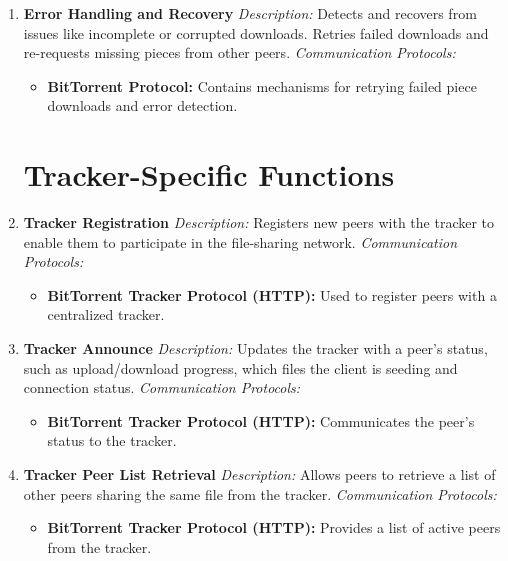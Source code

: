\documentclass[a4paper]{article}
\begin{document}
\begin{enumerate}[label=\textbf{\arabic*.}, leftmargin=*, itemsep=10pt]
    \item \textbf{Error Handling and Recovery}  
    \textit{Description:} Detects and recovers from issues like incomplete or corrupted downloads. Retries failed downloads and re-requests missing pieces from other peers.  
    \textit{Communication Protocols:}
    \begin{itemize}
        \item \textbf{BitTorrent Protocol:} Contains mechanisms for retrying failed piece downloads and error detection.
    \end{itemize}
    \section{Tracker-Specific Functions}
    \item \textbf{Tracker Registration}  
    \textit{Description:} Registers new peers with the tracker to enable them to participate in the file-sharing network.  
    \textit{Communication Protocols:}
    \begin{itemize}
        \item \textbf{BitTorrent Tracker Protocol (HTTP):} Used to register peers with a centralized tracker.
    \end{itemize}

    \item \textbf{Tracker Announce}  
    \textit{Description:} Updates the tracker with a peer’s status, such as upload/download progress, which files the client is seeding and connection status.  
    \textit{Communication Protocols:}
    \begin{itemize}
        \item \textbf{BitTorrent Tracker Protocol (HTTP):} Communicates the peer’s status to the tracker.
    \end{itemize}

    \item \textbf{Tracker Peer List Retrieval}  
    \textit{Description:} Allows peers to retrieve a list of other peers sharing the same file from the tracker.  
    \textit{Communication Protocols:}
    \begin{itemize}
        \item \textbf{BitTorrent Tracker Protocol (HTTP):} Provides a list of active peers from the tracker.
    \end{itemize}

\end{enumerate}
\end{document}
